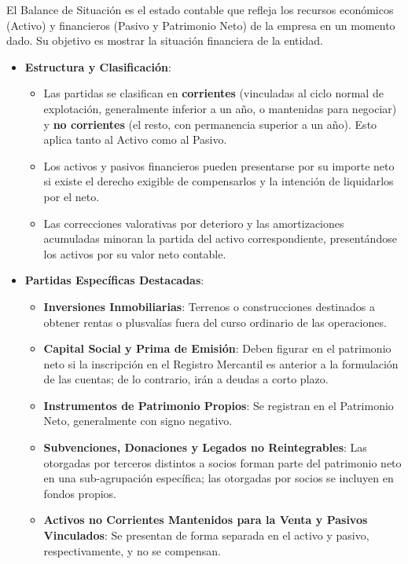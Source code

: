 \documentclass[
  paper=a4,
  ,captions=tableheading
]{scrbook}
\providecommand{\tightlist}{%
  \setlength{\itemsep}{0pt}\setlength{\parskip}{0pt}}
\begin{document}
El Balance de Situación es el estado contable que refleja los recursos
económicos (Activo) y financieros (Pasivo y Patrimonio Neto) de la
empresa en un momento dado. Su objetivo es mostrar la situación
financiera de la entidad.

\begin{itemize}
\tightlist
\item
  \textbf{Estructura y Clasificación}:

  \begin{itemize}
  \tightlist
  \item
    Las partidas se clasifican en \textbf{corrientes} (vinculadas al
    ciclo normal de explotación, generalmente inferior a un año, o
    mantenidas para negociar) y \textbf{no corrientes} (el resto, con
    permanencia superior a un año). Esto aplica tanto al Activo como al
    Pasivo.
  \item
    Los activos y pasivos financieros pueden presentarse por su importe
    neto si existe el derecho exigible de compensarlos y la intención de
    liquidarlos por el neto.
  \item
    Las correcciones valorativas por deterioro y las amortizaciones
    acumuladas minoran la partida del activo correspondiente,
    presentándose los activos por su valor neto contable.
  \end{itemize}
\item
  \textbf{Partidas Específicas Destacadas}:

  \begin{itemize}
  \tightlist
  \item
    \textbf{Inversiones Inmobiliarias}: Terrenos o construcciones
    destinados a obtener rentas o plusvalías fuera del curso ordinario
    de las operaciones.
  \item
    \textbf{Capital Social y Prima de Emisión}: Deben figurar en el
    patrimonio neto si la inscripción en el Registro Mercantil es
    anterior a la formulación de las cuentas; de lo contrario, irán a
    deudas a corto plazo.
  \item
    \textbf{Instrumentos de Patrimonio Propios}: Se registran en el
    Patrimonio Neto, generalmente con signo negativo.
  \item
    \textbf{Subvenciones, Donaciones y Legados no Reintegrables}: Las
    otorgadas por terceros distintos a socios forman parte del
    patrimonio neto en una sub-agrupación específica; las otorgadas por
    socios se incluyen en fondos propios.
  \item
    \textbf{Activos no Corrientes Mantenidos para la Venta y Pasivos
    Vinculados}: Se presentan de forma separada en el activo y pasivo,
    respectivamente, y no se compensan.
  \end{itemize}
\end{itemize}
\end{document}
